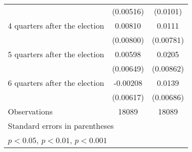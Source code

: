 \begin{table}[htbp]
\begin{tabular}{l*{2}{c}}
                    &   (0.00516)         &    (0.0101)         \\
[1em]
 4 quarters after the election&     0.00810         &      0.0111         \\
                    &   (0.00800)         &   (0.00781)         \\
[1em]
 5 quarters after the election&     0.00598         &      0.0205\sym{*}  \\
                    &   (0.00649)         &   (0.00862)         \\
[1em]
 6 quarters after the election&    -0.00208         &      0.0139\sym{*}  \\
                    &   (0.00617)         &   (0.00686)         \\
\hline
Observations        &       18089         &       18089         \\
\hline\hline
\multicolumn{3}{l}{\footnotesize Standard errors in parentheses}\\
\multicolumn{3}{l}{\footnotesize \sym{*} \(p<0.05\), \sym{**} \(p<0.01\), \sym{***} \(p<0.001\)}\\
\end{tabular}
\end{table}
